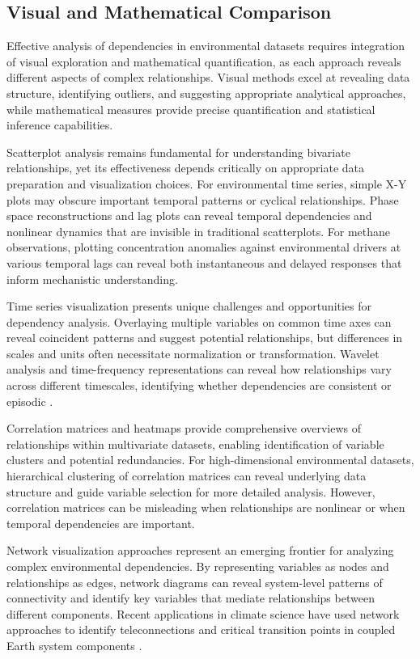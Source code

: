 \subsection{Visual and Mathematical Comparison}

Effective analysis of dependencies in environmental datasets requires integration of visual exploration and mathematical quantification, as each approach reveals different aspects of complex relationships. Visual methods excel at revealing data structure, identifying outliers, and suggesting appropriate analytical approaches, while mathematical measures provide precise quantification and statistical inference capabilities.

Scatterplot analysis remains fundamental for understanding bivariate relationships, yet its effectiveness depends critically on appropriate data preparation and visualization choices. For environmental time series, simple X-Y plots may obscure important temporal patterns or cyclical relationships. Phase space reconstructions and lag plots can reveal temporal dependencies and nonlinear dynamics that are invisible in traditional scatterplots. For methane observations, plotting concentration anomalies against environmental drivers at various temporal lags can reveal both instantaneous and delayed responses that inform mechanistic understanding.

Time series visualization presents unique challenges and opportunities for dependency analysis. Overlaying multiple variables on common time axes can reveal coincident patterns and suggest potential relationships, but differences in scales and units often necessitate normalization or transformation. Wavelet analysis and time-frequency representations can reveal how relationships vary across different timescales, identifying whether dependencies are consistent or episodic \cite{tongal_forecasting_2021}.

Correlation matrices and heatmaps provide comprehensive overviews of relationships within multivariate datasets, enabling identification of variable clusters and potential redundancies. For high-dimensional environmental datasets, hierarchical clustering of correlation matrices can reveal underlying data structure and guide variable selection for more detailed analysis. However, correlation matrices can be misleading when relationships are nonlinear or when temporal dependencies are important.

Network visualization approaches represent an emerging frontier for analyzing complex environmental dependencies. By representing variables as nodes and relationships as edges, network diagrams can reveal system-level patterns of connectivity and identify key variables that mediate relationships between different components. Recent applications in climate science have used network approaches to identify teleconnections and critical transition points in coupled Earth system components \cite{Runge2019}.


